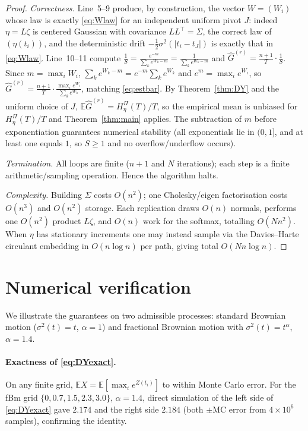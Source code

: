 \documentclass{amsart}
\theoremstyle{definition}
\newcommand{\E}{\mathbb{E}}
\begin{document}
\begin{proof}
\emph{Correctness.} Line~5--9 produce, by construction, the vector
$W=(W_i)$ whose law is exactly \eqref{eq:Wlaw} for an independent uniform pivot
$J$: indeed $\eta=L\zeta$ is centered Gaussian with covariance
$LL^\top=\Sigma$, the correct law of $(\eta(t_i))$, and the deterministic drift
$-\tfrac12\sigma^2(|t_i-t_J|)$ is exactly that in \eqref{eq:Wlaw}. Line~10--11
compute
$\frac1S=\frac{e^{-m}}{\sum_k e^{W_k-m}}=\frac{1}{\sum_k e^{W_k-m}}$ and
$\widehat G^{(r)}=\frac{n+1}{T}\cdot\frac1S$. Since $m=\max_i W_i$,
$\sum_k e^{W_k-m}=e^{-m}\sum_k e^{W_k}$ and
$e^{m}=\max_i e^{W_i}$, so
$\widehat G^{(r)}=\frac{n+1}{T}\cdot\frac{\max_i e^{W_i}}{\sum_k e^{W_k}}$,
matching \eqref{eq:estbar}. By Theorem~\ref{thm:DY} and the uniform choice of
$J$, $\E\widehat G^{(r)}=H_\eta^\Pi(T)/T$, so the empirical mean is unbiased for
$H_\eta^\Pi(T)/T$ and Theorem~\ref{thm:main} applies. The subtraction of $m$
before exponentiation guarantees numerical stability (all exponentials lie in
$(0,1]$, and at least one equals $1$, so $S\ge1$ and no overflow/underflow
occurs).

\emph{Termination.} All loops are finite ($n+1$ and $N$ iterations); each step is
a finite arithmetic/sampling operation. Hence the algorithm halts.

\emph{Complexity.} Building $\Sigma$ costs $O(n^2)$; one Cholesky/eigen
factorisation costs $O(n^3)$ and $O(n^2)$ storage. Each replication draws
$O(n)$ normals, performs one $O(n^2)$ product $L\zeta$, and $O(n)$ work for the
softmax, totalling $O(N n^2)$. When $\eta$ has stationary increments one may
instead sample via the Davies--Harte circulant embedding in $O(n\log n)$ per path,
giving total $O(N n\log n)$.
\end{proof}

\section{Numerical verification}\label{sec:num}

We illustrate the guarantees on two admissible processes:
standard Brownian motion ($\sigma^2(t)=t$, $\alpha=1$) and fractional Brownian
motion with $\sigma^2(t)=t^\alpha$, $\alpha=1.4$.

\paragraph{Exactness of \eqref{eq:DYexact}.}
On any finite grid, $\E X=\E[\max_i e^{Z(t_i)}]$ to within Monte Carlo error.
For the fBm grid $\{0,0.7,1.5,2.3,3.0\}$, $\alpha=1.4$, direct simulation of the
left side of \eqref{eq:DYexact} gave $2.174$ and the right side $2.184$
(both $\pm$MC error from $4\times10^6$ samples), confirming the identity.
\end{document}
